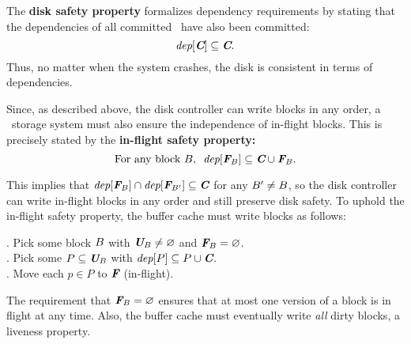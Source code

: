 The \textbf{disk safety property} formalizes dependency requirements by
 stating that the dependencies of all committed \patches\ have also been
 committed:
%
\[ \PDepset{\PDisk} \subseteq \PDisk. \]
%
Thus, no matter when the system crashes, the disk is consistent in terms of
dependencies.
%
%
\begin{comment}
 However, \Kudos\ can only control when \patches\ are handed to the disk
 controller, not when they are written to disk.
 Disk controller behavior is encapsulated in the following atomic action:

 \begin{tabbing}
 \textit{Commit block:} \\
 \quad Pick some block $b$ with $\PInf[b] \neq \emptyset$. \\
 \quad Move each $p \in \PInf[b]$ to $\PDisk$ (committed).
 \end{tabbing}
\end{comment}
%
Since, as described above, the disk controller can write blocks in any
 order, a \Kudos\ storage system must also ensure
the independence of in-flight blocks.  This is precisely stated
by the \textbf{in-flight safety property:}
%
\[ \text{For any block $\PB$,~~} \PDepset{\PInf[\PB]} \subseteq \PDisk \cup \PInf[\PB] . \]
%
\begin{comment}
(The union with $\PInf[\PB]$ is necessary for the case of multiple in-flight
\patches\ on the same block.)
\end{comment}
%
This implies that $\PDepset{\PInf[\PB]} \cap \PDepset{\PInf[\PB']} \subseteq \PDisk$ for
 any $B' \neq B$, so the disk controller can write in-flight blocks
 in any order and still preserve disk safety.
%
To uphold the in-flight safety property, the buffer cache must
 write blocks as follows:
%
\begin{tabbing}
\quad {}. Pick some block $B$ with $\PMem[\PB] \neq \emptyset$ and $\PInf[\PB] =
\emptyset$. \\
\quad {}. Pick some $P \subseteq \PMem[\PB]$ with $\PDepset{P} \subseteq P \cup
\PDisk$. \\
\quad {}. Move each $p \in P$ to $\PInf$ (in-flight).
\end{tabbing}
%
\noindent
%
The requirement that $\PInf[\PB] = \emptyset$ ensures that at most one version of
 a block is in flight at any time.
%
Also, the buffer cache must eventually write \emph{all} dirty blocks, a
 liveness property.

